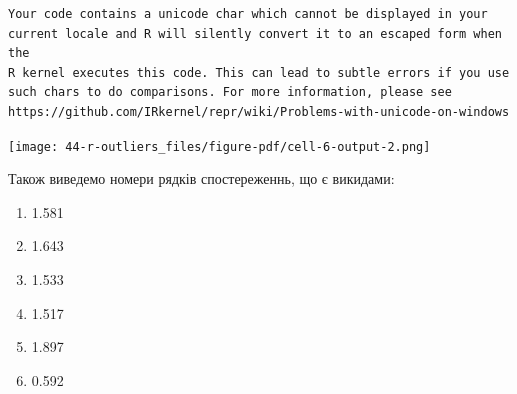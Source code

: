 \documentclass[
  letterpaper,
  DIV=11,
  numbers=noendperiod]{scrreprt}
\newenvironment{Shaded}{\begin{snugshade}}{\end{snugshade}}
\newcommand{\AttributeTok}[1]{\textcolor[rgb]{0.40,0.45,0.13}{#1}}
\newcommand{\CommentTok}[1]{\textcolor[rgb]{0.37,0.37,0.37}{#1}}
\newcommand{\DecValTok}[1]{\textcolor[rgb]{0.68,0.00,0.00}{#1}}
\newcommand{\FloatTok}[1]{\textcolor[rgb]{0.68,0.00,0.00}{#1}}
\newcommand{\FunctionTok}[1]{\textcolor[rgb]{0.28,0.35,0.67}{#1}}
\newcommand{\NormalTok}[1]{\textcolor[rgb]{0.00,0.23,0.31}{#1}}
\newcommand{\SpecialCharTok}[1]{\textcolor[rgb]{0.37,0.37,0.37}{#1}}
\newcommand{\StringTok}[1]{\textcolor[rgb]{0.13,0.47,0.30}{#1}}
\providecommand{\tightlist}{%
  \setlength{\itemsep}{0pt}\setlength{\parskip}{0pt}}\usepackage{longtable,booktabs,array}
\begin{document}
\begin{Shaded}
\end{Shaded}

\begin{verbatim}
Your code contains a unicode char which cannot be displayed in your
current locale and R will silently convert it to an escaped form when the
R kernel executes this code. This can lead to subtle errors if you use
such chars to do comparisons. For more information, please see
https://github.com/IRkernel/repr/wiki/Problems-with-unicode-on-windows
\end{verbatim}

\texttt{[image: 44-r-outliers\_files/figure-pdf/cell-6-output-2.png]}

Також виведемо номери рядків спостереженнь, що є викидами:

\begin{Shaded}
\end{Shaded}

\begin{enumerate}
\def\labelenumi{\arabic{enumi}.}
\tightlist
\item
  1.581
\item
  1.643
\item
  1.533
\item
  1.517
\item
  1.897
\item
  0.592
\end{enumerate}

\begin{Shaded}
\end{Shaded}
\end{document}

